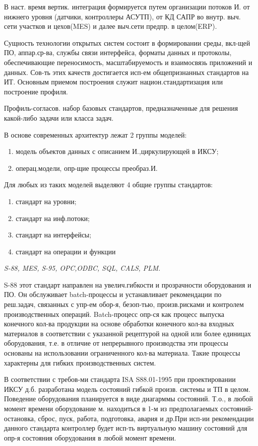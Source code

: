 \documentclass[unicode, 12pt, a4paper, oneside]{article}
\begin{document}
В наст. время вертик. интеграция формируется путем организации потоков И. от нижнего уровня (датчики, контроллеры АСУТП), от КД САПР во внутр. выч. сети участков и цехов(MES) и далее выч.сети предпр. в целом(ERP).

Сущность технологии открытых систем состоит в формировании среды, вкл-щей ПО, аппар.ср-ва, службы связи интерфейса, форматы данных и протоколы, обеспечивающие переносимость, масштабируемость и взаимосвязь приложений и данных. Сов-ть этих качеств достигается исп-ем общепризнанных стандартов на ИТ. Основным приемом построения служит национ.стандартизация или построение профиля.

Профиль-согласов. набор базовых стандартов, предназначенные для решения какой-либо задачи или класса задач.

В основе современных архитектур лежат 2 группы моделей: 
\begin{enumerate}
\item модель объектов данных с описанием И.,циркулирующей в ИКСУ;

\item операц.модели, опр-щие процессы преобраз.И.
\end{enumerate}
Для любых из таких моделей выделяют 4 общие группы стандартов:
\begin{enumerate}
\item стандарт на уровни;
\item стандарт на инф.потоки;
\item стандарт на интерфейсы; 
\item стандарт на операции и функции
\end{enumerate}

\textit{S-88, MES, S-95, OPC,ODBC, SQL, CALS, PLM}.

S-88 этот стандарт направлен на увелич.гибкости и прозрачности оборудования  и ПО. Он обслуживает batch-процессы и устанавливает рекомендации по реш.задач, связанных с упр-ем обор-я, безоп-тью, произв.рисками  и контролем производственных операций. Batch-процесс опр-ся как процесс выпуска конечного кол-ва продукции на основе обработки конечного кол-ва входных материалов в соответствии с указанной рецептурой на одной или более единицах оборудования, т.е. в отличие от непрерывного производства эти процессы основаны на использовании ограниченного кол-ва материала. Такие процессы характерны для гибких производственных систем.

В соответствии с требов-ми стандарта ISA S88.01-1995 при проектировании ИКСУ д.б. разработана модель состояний гибкой произв. системы и ТП в целом. Поведение оборудования планируется в виде диагарммы состояний. Т.о., в любой момент времени оборудование м. находиться в 1-м из предполагаемых состояний-остановка, сброс, пуск, работа, подготовка, авария и др.При исп-ии рекомендации данного стандарта контроллер будет исп-ть виртуальную машину состояний для опр-я состояния оборудования в любой момент времени.
\end{document}
